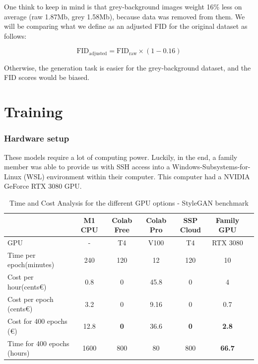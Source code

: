 \documentclass{article}
\begin{document}
One think to keep in mind is that grey-background images weight 16\% less on average (raw 1.87Mb, grey 1.58Mb), because data was removed from them. We will be comparing what we define as an adjusted FID for the original dataset as follows:

\[ \text{FID}_{\text{adjusted}} = \text{FID}_{\text{raw}} \times (1 - 0.16) \]

Otherwise, the generation task is easier for the grey-background dataset, and the FID scores would be biased.

\section{Training}

\subsubsection*{Hardware setup}

These models require a lot of computing power. Luckily, in the end, a family member was able to provide us with SSH access into a Windows-Subsystems-for-Linux (WSL) environment within their computer. This computer had a NVIDIA GeForce RTX 3080 GPU.

\begin{table}[H]
  \caption{Time and Cost Analysis for the different GPU options - StyleGAN benchmark}
  \centering
  \begin{tabular}{lcccccl}
    \toprule
    & \multicolumn{1}{c}{M1 CPU} & \multicolumn{1}{c}{Colab Free} & \multicolumn{1}{c}{Colab Pro} & \multicolumn{1}{c}{SSP Cloud\footnotemark} & \multicolumn{1}{c}{Family GPU} \\
    \midrule
    GPU & - & T4 & V100 & T4 & RTX 3080 \\
    Time per epoch\footnotemark (minutes) & 240 & 120 & 12 & 120 & 10 \\
    Cost per hour\footnotemark (cents€) & 0.8 & 0 & 45.8\footnotemark & 0 & 4 \\
    Cost per epoch (cents€) & 3.2 & 0 & 9.16 & 0 & 0.7 \\
    Cost for 400 epochs (€) & 12.8 & \textbf{0} & 36.6 & \textbf{0} & \textbf{2.8} \\
    Time for 400 epochs (hours) & 1600 & 800 & 80 & 800 & \textbf{66.7} \\
    \bottomrule
  \end{tabular}
\end{table}

\end{document}
